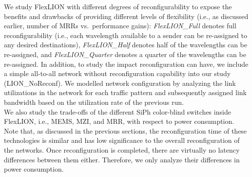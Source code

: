 We study FlexLION with different degrees of reconfigurability to expose the benefits and drawbacks of providing different levels of flexibility (i.e., as discussed earlier, number of MRRs vs.\ performance gains): \textit{FlexLION\_Full} denotes full reconfigurability (i.e., each wavelength available to a sender can be re-assigned to any desired destinations), \textit{FlexLION\_Half} denotes half of the wavelengths can be re-assigned, and \textit{FlexLION\_Quarter} denotes a quarter of the wavelengths can be re-assigned. In addition, to study the impact reconfiguration can have, we include a simple all-to-all network without reconfiguration capability into our study (LION\_NoReconf). We modelled network configuration by analyzing the link utilizations in the network for each traffic pattern and subsequently assigned link bandwidth based on the utilization rate of the previous run. \\
We also study the trade-offs of the different SiPh color-blind switches inside FlexLION, i.e., MEMS, MZI, and MRR, with respect to power consumption. Note that, as discussed in the previous sections, the reconfiguration time of these technologies is similar and has low significance to the overall reconfiguration of the networks. Once reconfiguration is completed, there are virtually no latency differences between them either. Therefore, we only analyze their differences in power consumption.

